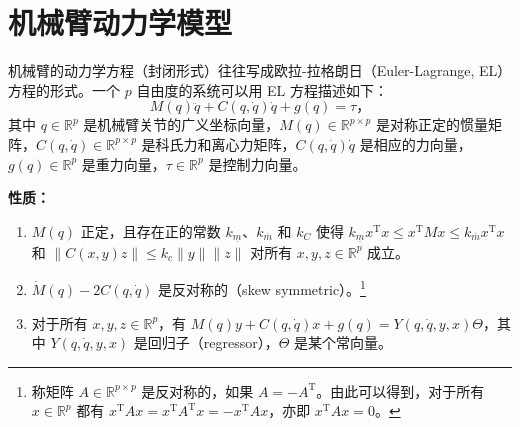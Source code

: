\section{机械臂动力学模型}\label{6Aref}

机械臂的动力学方程（封闭形式）往往写成欧拉-拉格朗日（Euler-Lagrange, EL）方程的形式。一个 $p$ 自由度的系统可以用 EL 方程描述如下：
\begin{equation} \label{robotic_model}
    M(q) \ddot{q} + C(q, \dot{q}) \dot{q} + g(q) = \tau \text{，}
\end{equation}
其中 $q \in \mathbb{R}^p$ 是机械臂关节的广义坐标向量，$M(q) \in \mathbb{R}^{p \times p}$ 是对称正定的惯量矩阵，$C(q, \dot{q}) \in \mathbb{R}^{p \times p}$ 是科氏力和离心力矩阵，$C(q,\dot{q})\dot{q}$ 是相应的力向量，$g(q)\in \mathbb{R}^p$ 是重力向量，$\tau \in \mathbb{R}^p$ 是控制力向量。

\noindent\textbf{性质：}
\begin{enumerate}
    \item $M(q)$ 正定，且存在正的常数 $k_{\underline{m}}$、$k_{\overline{m}}$ 和 $k_C$ 使得 $k_{\underline{m}} x^\mathrm{T} x \leq x^\mathrm{T} M x \leq k_{\overline{m}} x^\mathrm{T} x$ 和 $\| C (x, y) z \| \leq k_c \| y \| \| z \|$ 对所有 $x, y , z \in \mathbb{R}^p$ 成立。
    \item $\dot{M} (q) - 2 C (q, \dot{q})$ 是反对称的（skew symmetric）。\footnote{称矩阵 $A \in \mathbb{R}^{p \times p}$ 是反对称的，如果 $A = - A^\mathrm{T}$。由此可以得到，对于所有 $x \in \mathbb{R}^p$ 都有 $x^\mathrm{T} A x = x^\mathrm{T} A^\mathrm{T} x = - x^\mathrm{T} A x$，亦即 $x^\mathrm{T} A x = 0$。}
    \item 对于所有 $x, y , z \in \mathbb{R}^p$，有 $M (q) y + C (q, \dot{q}) x + g (q) = Y (q, \dot{q}, y, x) \Theta$，其中 $Y (q, \dot{q}, y, x)$ 是回归子（regressor），$\Theta$ 是某个常向量。
\end{enumerate}

